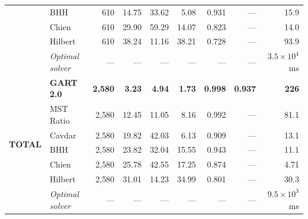\begin{table}[!ht]
{\begin{tabular}{@{}ll rrrrrrr@{}}
    & BHH & 610 & 14.75 & 33.62 & 5.08 & 0.931 & --- & 15.9 \\
    & Chien & 610 & 29.90 & 59.29 & 14.07 & 0.823 & --- & 14.0 \\
    & Hilbert & 610 & 38.24 & 11.16 & 38.21 & 0.728 & --- & 93.9 \\
    & \textit{Optimal solver} & --- & --- & --- & --- & --- & --- & $3.5\times 10^{4}$~ms \\
    \midrule
    \multirow{7}{*}{\textbf{TOTAL}}
    & \textbf{GART 2.0} & \textbf{2{,}580} & \textbf{3.23} & \textbf{4.94} & \textbf{1.73} & \textbf{0.998} & \textbf{0.937} & \textbf{226} \\
    & MST Ratio & 2{,}580 & 12.45 & 11.05 & 8.16 & 0.992 & --- & 81.1 \\
    & Cavdar & 2{,}580 & 19.82 & 42.03 & 6.13 & 0.909 & --- & 13.1 \\
    & BHH & 2{,}580 & 23.82 & 32.04 & 15.55 & 0.943 & --- & 11.1 \\
    & Chien & 2{,}580 & 25.78 & 42.55 & 17.25 & 0.874 & --- & 4.71 \\
    & Hilbert & 2{,}580 & 31.01 & 14.23 & 34.99 & 0.801 & --- & 30.3 \\
    & \textit{Optimal solver} & --- & --- & --- & --- & --- & --- & $9.5\times 10^{3}$~ms \\
\bottomrule
\end{tabular}%
}
\end{table}

